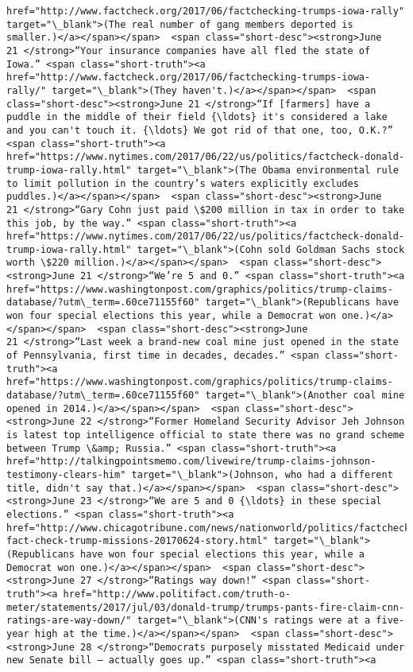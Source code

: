 \documentclass[11pt]{article}
\begin{document}
\begin{Verbatim}[commandchars=\\\{\}]
href="http://www.factcheck.org/2017/06/factchecking-trumps-iowa-rally" target="\_blank">(The real number of gang members deported is smaller.)</a></span></span>  <span class="short-desc"><strong>June 21 </strong>“Your insurance companies have all fled the state of Iowa.” <span class="short-truth"><a href="http://www.factcheck.org/2017/06/factchecking-trumps-iowa-rally/" target="\_blank">(They haven't.)</a></span></span>  <span class="short-desc"><strong>June 21 </strong>“If [farmers] have a puddle in the middle of their field {\ldots} it's considered a lake and you can't touch it. {\ldots} We got rid of that one, too, O.K.?” <span class="short-truth"><a href="https://www.nytimes.com/2017/06/22/us/politics/factcheck-donald-trump-iowa-rally.html" target="\_blank">(The Obama environmental rule to limit pollution in the country’s waters explicitly excludes puddles.)</a></span></span>  <span class="short-desc"><strong>June 21 </strong>“Gary Cohn just paid \$200 million in tax in order to take this job, by the way.” <span class="short-truth"><a href="https://www.nytimes.com/2017/06/22/us/politics/factcheck-donald-trump-iowa-rally.html" target="\_blank">(Cohn sold Goldman Sachs stock worth \$220 million.)</a></span></span>  <span class="short-desc"><strong>June 21 </strong>“We’re 5 and 0.” <span class="short-truth"><a href="https://www.washingtonpost.com/graphics/politics/trump-claims-database/?utm\_term=.60ce71155f60" target="\_blank">(Republicans have won four special elections this year, while a Democrat won one.)</a></span></span>  <span class="short-desc"><strong>June 21 </strong>“Last week a brand-new coal mine just opened in the state of Pennsylvania, first time in decades, decades.” <span class="short-truth"><a href="https://www.washingtonpost.com/graphics/politics/trump-claims-database/?utm\_term=.60ce71155f60" target="\_blank">(Another coal mine opened in 2014.)</a></span></span>  <span class="short-desc"><strong>June 22 </strong>“Former Homeland Security Advisor Jeh Johnson is latest top intelligence official to state there was no grand scheme between Trump \&amp; Russia.” <span class="short-truth"><a href="http://talkingpointsmemo.com/livewire/trump-claims-johnson-testimony-clears-him" target="\_blank">(Johnson, who had a different title, didn't say that.)</a></span></span>  <span class="short-desc"><strong>June 23 </strong>“We are 5 and 0 {\ldots} in these special elections.” <span class="short-truth"><a href="http://www.chicagotribune.com/news/nationworld/politics/factcheck/ct-fact-check-trump-missions-20170624-story.html" target="\_blank">(Republicans have won four special elections this year, while a Democrat won one.)</a></span></span>  <span class="short-desc"><strong>June 27 </strong>“Ratings way down!” <span class="short-truth"><a href="http://www.politifact.com/truth-o-meter/statements/2017/jul/03/donald-trump/trumps-pants-fire-claim-cnn-ratings-are-way-down/" target="\_blank">(CNN's ratings were at a five-year high at the time.)</a></span></span>  <span class="short-desc"><strong>June 28 </strong>“Democrats purposely misstated Medicaid under new Senate bill — actually goes up.” <span class="short-truth"><a 
\end{Verbatim}
\end{document}
